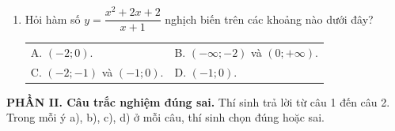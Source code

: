 \documentclass[12pt]{article}
\begin{document}
\begin{enumerate}[label=\textbf{Câu \arabic*.}, leftmargin=*]
		\item Hỏi hàm số $y = \dfrac{x^2 + 2x + 2}{x + 1}$ nghịch biến trên các khoảng nào dưới đây?
		
		\begin{center}
			\begin{tabular}{p{0.47\textwidth} p{}}
				A. $(-2; 0)$. &
				B. $(-\infty; -2)$ và $(0; +\infty)$. \\[2mm]
				C. $(-2; -1)$ và $(-1; 0)$. &
				D. $(-1; 0)$.
			\end{tabular}
		\end{center}
	\end{enumerate}
	\vspace{4mm}
	\noindent\textbf{PHẦN II. Câu trắc nghiệm đúng sai.} Thí sinh trả lời từ câu 1 đến câu 2. Trong mỗi ý a), b), c), d) ở mỗi câu, thí sinh chọn đúng hoặc sai.
	\vspace{2mm}
	
\end{document}
